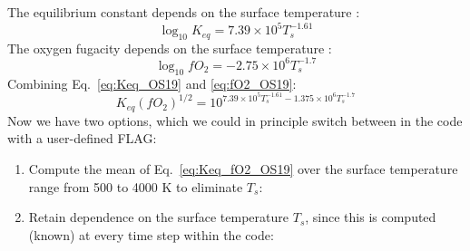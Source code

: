 The equilibrium constant depends on the surface temperature \citep[Eq.~41,][]{OS19}:
\begin{equation}
    \log_{10} K_{eq} = 7.39\times 10^5T_s^{-1.61}
    \label{eq:Keq_OS19}
\end{equation}
The oxygen fugacity depends on the surface temperature \citep[Eq.~40,][]{OS19}:
\begin{equation}
\log_{10} fO_2 = -2.75 \times 10^6 T_s^{-1.7}
\label{eq:fO2_OS19}
\end{equation}
Combining Eq.~\ref{eq:Keq_OS19} and \ref{eq:fO2_OS19}:
\begin{equation}
K_{eq} (fO_2)^{1/2} = 10^{7.39 \times 10^5 T_s^{-1.61}-1.375 \times 10^6 T_s^{-1.7}}
\label{eq:Keq_fO2_OS19}
\end{equation}
Now we have two options, which we could in principle switch between in the code with a user-defined FLAG:
\begin{enumerate}
\item Compute the mean of Eq.~\ref{eq:Keq_fO2_OS19} over the surface temperature range from 500 to 4000 K to eliminate $T_s$:
\item Retain dependence on the surface temperature $T_s$, since this is computed (known) at every time step within the code:
\end{enumerate}

